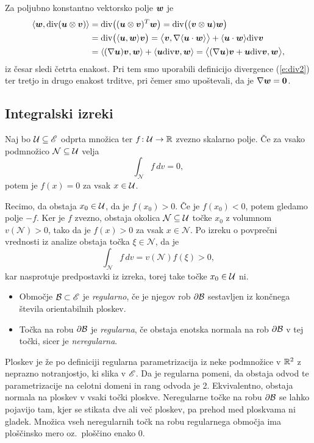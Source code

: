 	Za poljubno konstantno vektorsko polje $\boldsymbol w$ je
	\begin{align*}
		\langle\boldsymbol w,\mathrm{div}(\boldsymbol u\otimes\boldsymbol v)\rangle&=\mathrm{div}\big((\boldsymbol u\otimes\boldsymbol v)^T\boldsymbol w\big)=
		\mathrm{div}\big((\boldsymbol v\otimes\boldsymbol u)\boldsymbol w\big)\\
		&=\mathrm{div}\big(\langle\boldsymbol u,\boldsymbol w\rangle\boldsymbol v\big)
		=\big<\boldsymbol v,\nabla\langle\boldsymbol u\cdot\boldsymbol w\rangle\big>+\langle\boldsymbol u\cdot\boldsymbol w\rangle\mathrm{div}\boldsymbol v\\
		&=\langle(\nabla\boldsymbol u)\boldsymbol v,\boldsymbol w\rangle+\langle\boldsymbol u\mathrm{div}\boldsymbol v,\boldsymbol w\rangle
		=\big<(\nabla\boldsymbol u)\boldsymbol v+\boldsymbol u\mathrm{div}\boldsymbol v,\boldsymbol w\big>,
	\end{align*}
	iz česar sledi četrta enakost. Pri tem smo uporabili definicijo divergence (\ref{e:div2}) ter
	tretjo in drugo enakost trditve, pri čemer smo upoštevali, da je $\nabla\boldsymbol w=\mathbf 0$.
\endproof


\subsection{Integralski izreki}


\begin{trditev}\label{t:oiz}
	Naj bo $\mathcal U\subseteq\mathscr E$ odprta množica ter $f\colon \mathcal U\to \mathbb R$ zvezno skalarno polje.
	Če za vsako podmnožico $\mathcal{N}\subseteq \mathcal U$ velja
	\[ \int_{\mathcal{N}} f\,dv=0, \]
	potem je $f(x)=0$ za vsak $x\in \mathcal U$.
\end{trditev}
\proof
	Recimo, da obstaja $x_0\in \mathcal U$, da je $f(x_0)> 0$. Če je $f(x_0)< 0$, potem gledamo polje $-f$.
	Ker je $f$ zvezno, obstaja okolica $\mathcal{N}\subseteq \mathcal U$ točke $x_0$ z volumnom $v(\mathcal{N})>0$, tako da je $f(x)>0$
	za vsak $x\in \mathcal{N}$. Po izreku o povprečni vrednosti iz analize obstaja točka $\xi\in \mathcal{N}$, da je
	\[ \int_{\mathcal{N}}f\,dv=v(\mathcal{N})f(\xi)> 0, \]
	kar nasprotuje predpostavki iz izreka, torej take točke $x_0\in \mathcal U$ ni.
\endproof

\begin{definicija}
	\begin{itemize}
		\item
		Območje $\mathcal B\subset\mathscr E$ je \emph{regularno}, če je njegov rob $\partial \mathcal B$ sestavljen
		iz končnega števila orientabilnih ploskev.
		\item
		Točka na robu $\partial\mathcal B$ je \emph{regularna}, če obstaja enotska normala
		na rob $\partial\mathcal B$ v tej točki, sicer je \emph{neregularna}.
	\end{itemize}
\end{definicija}
Ploskev je že po definiciji regularna parametrizacija iz neke podmnožice v $\mathbb R^2$ z neprazno notranjostjo,
ki slika v $\mathscr E$. Da je regularna pomeni, da obstaja odvod te parametrizacije na celotni domeni in
rang odvoda je 2. Ekvivalentno, obstaja normala na ploskev v vsaki točki ploskve.
Neregularne točke na robu $\partial\mathcal B$ se lahko pojavijo tam, kjer se stikata dve ali več ploskev,
pa prehod med ploskvama ni gladek.
Množica vseh neregularnih točk na robu regularnega območja ima ploščinsko mero oz.~ploščino enako 0.

